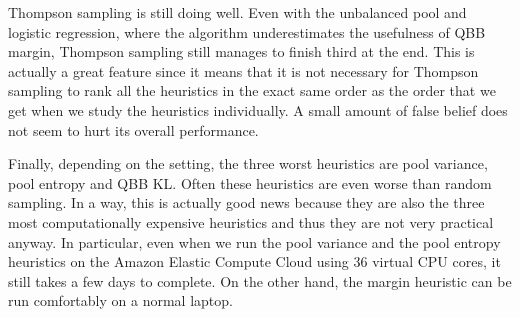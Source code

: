 Thompson sampling is still doing well. Even with the unbalanced pool and logistic regression, where
the algorithm underestimates the usefulness of QBB margin, Thompson sampling still manages to
finish third at the end. This is actually a great feature since it means that it is not necessary
for Thompson sampling to rank all the heuristics in the exact same order as the order that we get
when we study the heuristics individually. A small amount of false belief does not seem to hurt its
overall performance.

Finally, depending on the setting, the three worst heuristics are pool variance, pool entropy and
QBB KL. Often these heuristics are even worse than random sampling. In a way, this is actually good
news because they are also the three most computationally expensive heuristics and thus they are
not very practical anyway. In particular, even when we run the pool variance and the pool entropy
heuristics on the Amazon Elastic Compute Cloud using 36 virtual CPU cores, it still takes a few days
to complete. On the other hand, the margin heuristic can be run comfortably on a normal laptop.


